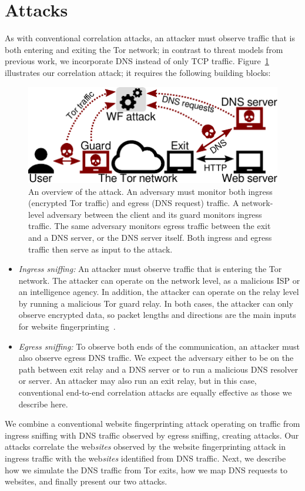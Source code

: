 \section{\name Attacks}
\label{sec:attack}

As with conventional correlation attacks, an attacker must observe
traffic that is both entering and exiting
the Tor network; in contrast to threat models from previous work, we
incorporate DNS instead of only
TCP traffic.
Figure~\ref{fig:attack-scenario} illustrates our correlation attack; it requires the
following building blocks:
\begin{figure}[t]
	\centering
	\includegraphics[width=0.8\linewidth]{figures/attack-scenario.pdf}
	\caption{An overview of the \name attack.  An adversary must monitor
		both ingress (encrypted Tor traffic) and egress (DNS request) traffic.
		A network-level adversary between the
		client and its guard monitors ingress traffic.  The same adversary
		monitors egress traffic between the exit and a DNS server, or the DNS
		server itself.  Both ingress and egress traffic then serve as input to the
		\name attack.}
	\label{fig:attack-scenario}
\end{figure}

\begin{itemize}
    \item \emph{Ingress sniffing:} An attacker must observe traffic that is
		entering the Tor network.  The attacker can operate on the network level,
		as a malicious ISP or an intelligence agency.  In addition, the
		attacker can operate on the relay level by running a malicious Tor guard
		relay.  In both cases, the attacker can only observe encrypted
		data, so packet lengths and
		directions are the main inputs for website fingerprinting~\cite{Panchenko2016a}.
    \item \emph{Egress sniffing:} To observe both ends of the communication, an
		attacker must also observe egress DNS traffic.  We expect the adversary
		either to be on the path between exit relay
		and a DNS server or to run a malicious DNS
		resolver or server.  An attacker may also run an exit relay,
		but in this case, conventional end-to-end correlation
                attacks are equally effective as those we describe here.
\end{itemize}
We combine a conventional website fingerprinting attack operating on traffic
from ingress sniffing with
DNS traffic observed by egress sniffing, creating \name attacks. Our attacks
correlate the web\emph{sites} observed by the website fingerprinting attack in
ingress traffic with
the web\emph{sites} identified from DNS traffic. Next, we describe how we
simulate the DNS traffic from Tor exits, how we map DNS requests to websites,
and finally present our two \name attacks.

